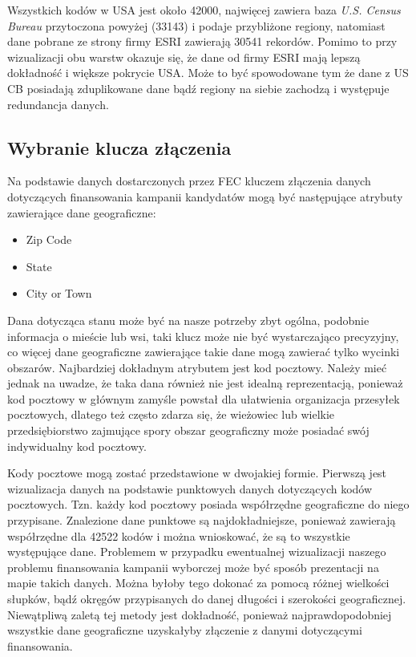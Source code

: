\documentclass[10pt,a4paper]{article}
\begin{document}
Wszystkich kodów w  USA jest około 42000, najwięcej zawiera baza  \textit{U.S. Census Bureau} przytoczona powyżej (33143) i podaje przybliżone regiony, natomiast dane pobrane ze strony firmy ESRI zawierają 30541 rekordów. Pomimo to przy wizualizacji obu warstw okazuje się, że dane od firmy ESRI mają lepszą dokładność i większe pokrycie USA. Może to być spowodowane tym że dane z US CB posiadają zduplikowane dane bądź regiony na siebie zachodzą i występuje redundancja danych.


\subsection{Wybranie klucza złączenia}
Na podstawie danych dostarczonych przez FEC kluczem złączenia danych dotyczących finansowania kampanii kandydatów mogą być następujące atrybuty zawierające dane geograficzne:

\begin{itemize}
\item Zip Code
\item State
\item City or Town
\end{itemize}

Dana dotycząca stanu może być na nasze potrzeby zbyt ogólna, podobnie informacja o mieście lub wsi, taki klucz może nie być wystarczająco precyzyjny, co więcej dane geograficzne zawierające takie dane mogą zawierać tylko wycinki obszarów. Najbardziej dokładnym atrybutem jest kod pocztowy. Należy mieć jednak na uwadze, że taka dana również nie jest idealną reprezentacją, ponieważ kod pocztowy w głównym zamyśle powstał dla ułatwienia organizacja przesyłek pocztowych, dlatego też często zdarza się, że wieżowiec lub wielkie przedsiębiorstwo zajmujące spory obszar geograficzny może posiadać swój indywidualny kod pocztowy. 

Kody pocztowe mogą zostać przedstawione w dwojakiej formie. Pierwszą jest wizualizacja danych na podstawie punktowych danych dotyczących kodów pocztowych. Tzn. każdy kod pocztowy posiada współrzędne geograficzne do niego przypisane. Znalezione dane punktowe są najdokładniejsze, ponieważ zawierają współrzędne dla 42522 kodów i można wnioskować, że są to wszystkie występujące dane. Problemem w przypadku ewentualnej wizualizacji naszego problemu finansowania kampanii wyborczej może być sposób prezentacji na mapie takich danych. Można byłoby tego dokonać za pomocą różnej wielkości słupków, bądź okręgów przypisanych do danej długości i szerokości geograficznej. Niewątpliwą zaletą tej metody jest dokładność, ponieważ najprawdopodobniej wszystkie dane geograficzne uzyskałyby złączenie z danymi dotyczącymi finansowania.
\end{document}
